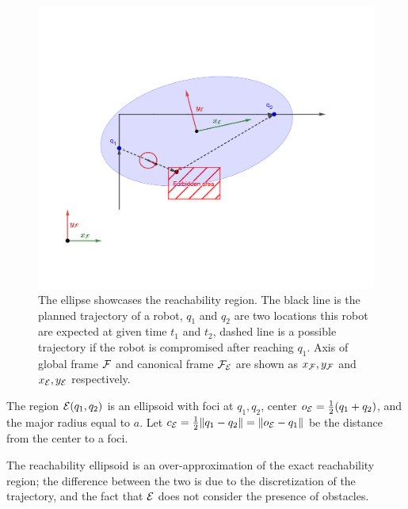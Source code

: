 \documentclass[journal]{IEEEtran}  %
\begin{document}
 \begin{figure}
    \centering
    \includegraphics[width=0.8\linewidth, trim = 2cm 2.5cm 2cm 5cm]{Reachability}
    \caption{The ellipse showcases the reachability region. The black line is the planned trajectory of a robot, $q_1$ and $q_2$ are two locations this robot are expected at given time $t_1$ and $t_2$, dashed line is a possible trajectory if the robot is compromised after reaching $q_1$. Axis of global frame $\mathcal{F}$ and canonical frame $\mathcal{F}_{\mathcal{E}}$ are shown as $x_{\mathcal{F}}, y_{\mathcal{F}}$ and $x_{\mathcal{E}}, y_{\mathcal{E}}$ respectively. }
    \label{fig:EllipseConstraintExample}
  \end{figure}
 

The region $\mathcal{E}(q_1,q_2)$ is an ellipsoid with foci at $q_1,q_2$, center $o_{\mathcal{E}} = \frac{1}{2}(q_1+q_2)$, and the major radius equal to $a$. Let $c_{\mathcal{E}}=\frac{1}{2}\lVert q_1-q_2\rVert=\lVert o_{\mathcal{E}}-q_1\rVert$ be the distance from the center to a foci.

The reachability ellipsoid is an over-approximation of the exact reachability region; the difference between the two is due to the discretization of the trajectory, and the fact that $\mathcal{E}$ does not consider the presence of obstacles.
\end{document}
